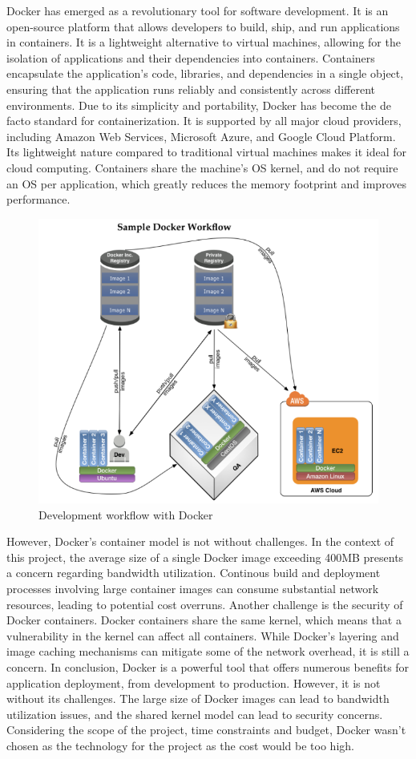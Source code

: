 Docker has emerged as a revolutionary tool for software development. It is an open-source platform that allows developers to build, ship, and run applications in containers. It is a lightweight alternative to virtual machines, allowing for the isolation of applications and their dependencies into containers. Containers encapsulate the application's code, libraries, and dependencies in a single object, ensuring that the application runs reliably and consistently across different environments.
Due to its simplicity and portability, Docker has become the de facto standard for containerization. It is supported by all major cloud providers, including Amazon Web Services, Microsoft Azure, and Google Cloud Platform. Its lightweight nature compared to traditional virtual machines makes it ideal for cloud computing. Containers share the machine's OS kernel, and do not require an OS per application, which greatly reduces the memory footprint and improves performance. \cite{merkel2014docker}

\begin{figure}[ht]
    \centering
    \includegraphics[width=0.8\linewidth]{images/docker.png}
    \caption{Development workflow with Docker}
    \label{fig:docker}
\end{figure}

However, Docker's container model is not without challenges. In the context of this project, the average size of a single Docker image exceeding 400MB presents a concern regarding bandwidth utilization. Continous build and deployment processes involving large container images can consume substantial network resources, leading to potential cost overruns. \cite{merkel2014docker}
Another challenge is the security of Docker containers. Docker containers share the same kernel, which means that a vulnerability in the kernel can affect all containers. \cite{dockerhub}
While Docker's layering and image caching mechanisms can mitigate some of the network overhead, it is still a concern.
In conclusion, Docker is a powerful tool that offers numerous benefits for application deployment, from development to production. However, it is not without its challenges. The large size of Docker images can lead to bandwidth utilization issues, and the shared kernel model can lead to security concerns. Considering the scope of the project, time constraints and budget, Docker wasn't chosen as the technology for the project as the cost would be too high.


